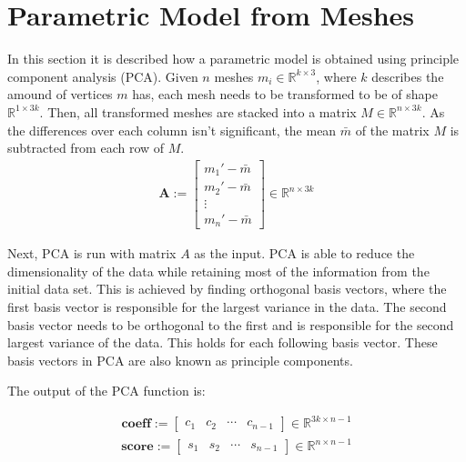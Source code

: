 \section{Parametric Model from Meshes}
\label{paramModel}
In this section it is described how a parametric model is obtained using principle component analysis (PCA). Given $n$ meshes $m_i \in \mathbb{R}^{k \times 3}$, where $k$ describes the amound of vertices $m$ has, each mesh needs to be transformed to be of shape $\mathbb{R}^{1 \times 3k}$. Then, all transformed meshes are stacked into a matrix $M \in \mathbb{R}^{n \times 3k}$. As the differences over each column isn't significant, the mean $\bar{m}$ of the matrix $M$ is subtracted from each row of $M$.
\begin{gather}
\mathbf{A} :=
\begin{bmatrix}
 m_1' - \bar{m} \\
 m_2' - \bar{m} \\
 \vdots \\
 m_n' - \bar{m}
\end{bmatrix}
\in \mathbb{R}^{n \times 3k}
\end{gather}

Next, PCA is run with matrix $A$ as the input. PCA is able to reduce the dimensionality of the data while retaining most of the information from the initial data set. This is achieved by finding orthogonal basis vectors, where the first basis vector is responsible for the largest variance in the data. The second basis vector needs to be orthogonal to the first and is responsible for the second largest variance of the data. This holds for each following basis vector. These basis vectors in PCA are also known as principle components.

The output of the PCA function is:

\begin{gather}
\mathbf{coeff} :=
\begin{bmatrix}
 c_1&c_2&\cdots&c_{n-1}
\end{bmatrix}
\in \mathbb{R}^{3k \times n-1}
\end{gather}
\begin{gather}
\mathbf{score} :=
\begin{bmatrix}
s_1&s_2&\cdots&s_{n-1}
\end{bmatrix}
\in \mathbb{R}^{n \times n-1}
\end{gather}

